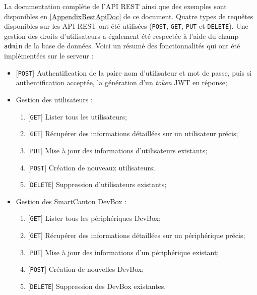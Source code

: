 La documentation complète de l'API REST ainsi que des exemples sont disponibles en \cref{AppendixRestApiDoc} de ce document. Quatre types de requêtes disponibles sur les API REST ont été utilisées (\texttt{POST}, \texttt{GET}, \texttt{PUT} et \texttt{DELETE}). Une gestion des droits d'utilisateurs a également été respectée à l'aide du champ \texttt{admin} de la base de données. Voici un résumé des fonctionnalités qui ont été implémentées sur le serveur : 
\begin{itemize}
    \item {[\texttt{POST}]} Authentification de la paire nom d'utilisateur et mot de passe, puis si authentification acceptée, la génération d'un \textit{token} JWT en réponse;
    
    \item Gestion des utilisateurs : 
    \begin{enumerate}
        \item {[\texttt{GET}]} Lister tous les utilisateurs;
        \item {[\texttt{GET}]} Récupérer des informations détaillées sur un utilisateur précis;
        \item {[\texttt{PUT}]} Mise à jour des informations d'utilisateurs existants;
        \item {[\texttt{POST}]} Création de nouveaux utilisateurs;
        \item {[\texttt{DELETE}]} Suppression d'utilisateurs existants;
    \end{enumerate}
    
    \item Gestion des SmartCanton DevBox : 
    \begin{enumerate}
        \item {[\texttt{GET}]} Lister tous les périphériques DevBox;
        \item {[\texttt{GET}]} Récupérer des informations détaillées sur un périphérique précis;
        \item {[\texttt{PUT}]} Mise à jour des informations d'un périphérique existant;
        \item {[\texttt{POST}]} Création de nouvelles DevBox;
        \item {[\texttt{DELETE}]} Suppression des DevBox existantes.\\
    \end{enumerate}
\end{itemize}


